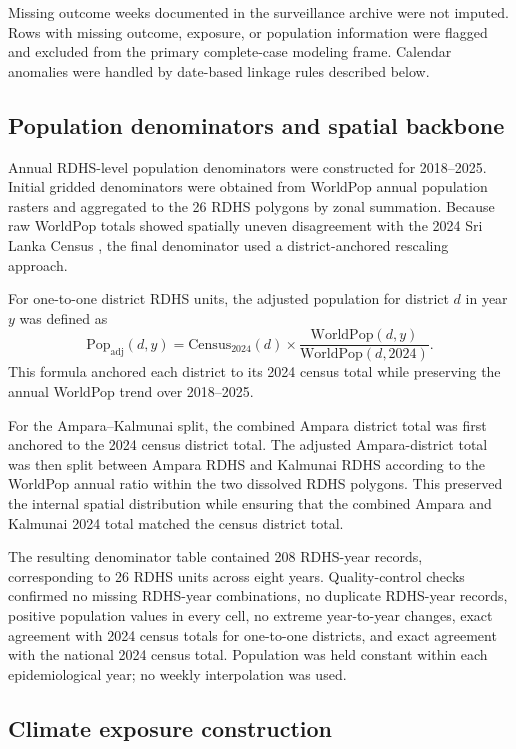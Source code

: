 \documentclass[11pt,a4paper]{article}
\begin{document}
Missing outcome weeks documented in the surveillance archive were not imputed. Rows with missing outcome, exposure, or population information were flagged and excluded from the primary complete-case modeling frame. Calendar anomalies were handled by date-based linkage rules described below.

\subsection{Population denominators and spatial backbone}
\label{subsec:population-denominators}

Annual RDHS-level population denominators were constructed for 2018--2025. Initial gridded denominators were obtained from WorldPop annual population rasters
\citep{Tatem2017,WorldPop2025} and aggregated to the 26 RDHS polygons by zonal summation. Because raw WorldPop totals showed spatially uneven disagreement with the 2024 Sri Lanka Census
\citep{SriLankaCensus2024}, the final denominator used a district-anchored rescaling approach.

For one-to-one district RDHS units, the adjusted population for district $d$ in year $y$ was defined as
\[
\mathrm{Pop}_{\mathrm{adj}}(d,y)
=
\mathrm{Census}_{2024}(d)
\times
\frac{\mathrm{WorldPop}(d,y)}
{\mathrm{WorldPop}(d,2024)}.
\]
This formula anchored each district to its 2024 census total while preserving the annual WorldPop trend over 2018--2025.

For the Ampara--Kalmunai split, the combined Ampara district total was first anchored to the 2024 census district total. The adjusted Ampara-district total was then split between Ampara RDHS and Kalmunai RDHS according to the WorldPop annual ratio within the two dissolved RDHS polygons. This preserved the internal spatial distribution while ensuring that the combined Ampara and Kalmunai 2024 total matched the census district total.

The resulting denominator table contained 208 RDHS-year records, corresponding to 26 RDHS units across eight years. Quality-control checks confirmed no missing RDHS-year combinations, no duplicate RDHS-year records, positive population values in every cell, no extreme year-to-year changes, exact agreement with 2024 census totals for one-to-one districts, and exact agreement with the national 2024 census total. Population was held constant within each epidemiological year; no weekly interpolation was used.

\subsection{Climate exposure construction}
\label{subsec:climate-exposure}
\end{document}
